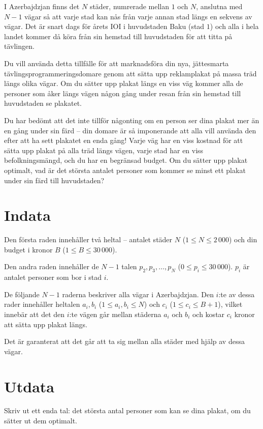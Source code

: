 \noindent
I Azerbajdzjan finns det $N$ städer, numrerade mellan $1$ och $N$, anslutna med $N - 1$ vägar så att varje stad kan nås från varje annan stad längs en sekvens av vägar.
Det är snart dags för årets IOI i huvudstaden Baku (stad $1$) och alla i hela landet kommer då köra från sin hemstad till huvudstaden för att titta på tävlingen.

Du vill använda detta tillfälle för att marknadsföra din nya, jättesmarta tävlingsprogrammeringsdomare genom att sätta upp reklamplakat på massa träd längs olika vägar.
Om du sätter upp plakat längs en viss väg kommer alla de personer som åker längs vägen någon gång under resan från sin hemstad till huvudstaden se plakatet.

Du har bedömt att det inte tillför någonting om en person ser dina plakat mer än en gång under sin färd -- din domare är så imponerande att alla vill använda den efter att ha sett plakatet en enda gång!
Varje väg har en viss kostnad för att sätta upp plakat på alla träd längs vägen, varje stad har en viss befolkningsmängd, och du har en begränsad budget.
Om du sätter upp plakat optimalt, vad är det största antalet personer som kommer se minst ett plakat under sin färd till huvudstaden?

\section*{Indata}
Den första raden innehåller två heltal -- antalet städer $N$ ($1 \le N \le 2\,000$) och din budget i kronor $B$ ($1 \le B \le 30\,000$).

Den andra raden innehåller de $N-1$ talen $p_2, p_3, \dots, p_N$ ($0 \le p_i \le 30\,000$).
$p_i$ är antalet personer som bor i stad $i$.

De följande $N-1$ raderna beskriver alla vägar i Azerbajdzjan.
Den $i$:te av dessa rader innehåller heltalen $a_i, b_i$ ($1 \le a_i, b_i \le N$) och $c_i$ ($1 \le c_i \le B+1$), vilket innebär att det den $i$:te vägen går mellan städerna $a_i$ och $b_i$ och kostar $c_i$ kronor att sätta upp plakat längs.

Det är garanterat att det går att ta sig mellan alla städer med hjälp av dessa vägar.

\section*{Utdata}
Skriv ut ett enda tal: det största antal personer som kan se dina plakat, om du sätter ut dem optimalt.

